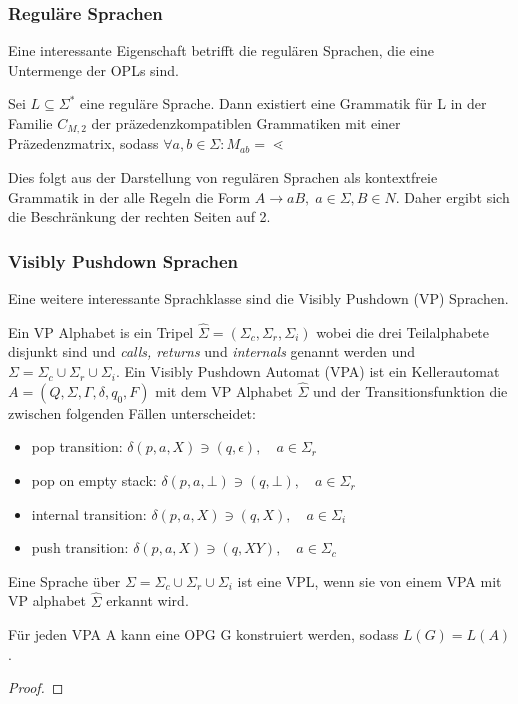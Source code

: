 \subsubsection{Reguläre Sprachen}
Eine interessante Eigenschaft betrifft die regulären Sprachen, die eine Untermenge der OPLs sind.
\begin{lemma}
Sei $L\subseteq\Sigma^*$ eine reguläre Sprache. Dann existiert eine Grammatik für L in der Familie $C_{M,2}$ der präzedenzkompatiblen Grammatiken mit einer Präzedenzmatrix, sodass $\forall a,b\in \Sigma: M_{ab}=\lessdot$
\end{lemma}
Dies folgt aus der Darstellung von regulären Sprachen als kontextfreie Grammatik in der alle Regeln die Form $A\rightarrow aB, \; a \in \Sigma, B \in N$. Daher ergibt sich die Beschränkung der rechten Seiten auf 2.

\subsubsection{Visibly Pushdown Sprachen}
Eine weitere interessante Sprachklasse sind die Visibly Pushdown (VP) Sprachen.
\begin{definition}
Ein VP Alphabet is ein Tripel $\hat{\Sigma}=(\Sigma_c, \Sigma_r, \Sigma_i)$ wobei die drei Teilalphabete disjunkt sind und \textit{calls, returns} und \textit{internals} genannt werden und $\Sigma=\Sigma_c \cup \Sigma_r \cup \Sigma_i$. Ein Visibly Pushdown Automat (VPA) ist ein Kellerautomat $A=(Q, \Sigma, \Gamma, \delta, q_0, F)$ mit dem VP Alphabet $\hat{\Sigma}$ und der Transitionsfunktion die zwischen folgenden Fällen unterscheidet:
\begin{itemize}
\item
pop transition: $\delta(p,a,X) \ni (q, \epsilon), \quad a \in \Sigma_r$
\item
pop on empty stack: $\delta(p, a, \bot) \ni (q, \bot), \quad a \in \Sigma_r$
\item
internal transition: $\delta(p,a,X) \ni (q, X), \quad a \in \Sigma_i$
\item
push transition: $\delta(p, a, X) \ni (q, XY), \quad a \in \Sigma_c$
\end{itemize}
\end{definition}
Eine Sprache über $\Sigma=\Sigma_c \cup \Sigma_r \cup \Sigma_i$ ist eine VPL, wenn sie von einem VPA mit VP alphabet $\hat{\Sigma}$ erkannt wird.

\begin{lemma}
Für jeden VPA A kann eine OPG G konstruiert werden, sodass $L(G)=L(A)$.
\end{lemma}
\begin{proof}

\end{proof}